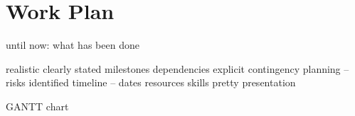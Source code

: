 \chapter{Work Plan}
\label{chap:plan}

until now: what has been done

realistic
clearly stated milestones
dependencies explicit
contingency planning – risks identified
timeline – dates
resources
skills
pretty presentation

GANTT chart

